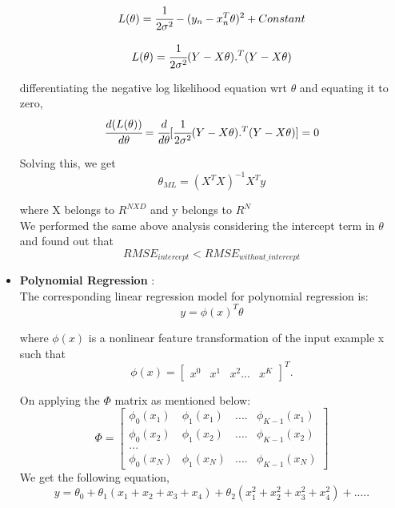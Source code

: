 \documentclass{article}
\begin{document}
\begin{itemize}
     \begin{equation*}
    L(\theta) = \cfrac{1}{2\sigma^2} - (y_n-x_n^T\theta)^2  + Constant
    \end{equation*}
    
     \begin{equation*}
    L(\theta) = \cfrac{1}{2\sigma^2}(Y - X\theta).^T (Y - X\theta) 
    \end{equation*}
    
    differentiating the negative log likelihood equation wrt $\theta$ and equating it to zero, \\
    \begin{equation*}
    \cfrac{d(L(\theta))}{d\theta} = \cfrac{d}{d\theta}
     [\cfrac{1}{2\sigma^2}(Y - X\theta).^T (Y - X\theta)] = 0 
    \end{equation*}
    
    Solving this, we get 
    \begin{equation*}
    \theta_{ML} = (X^{T}X)^{-1}X^{T}y
    \end{equation*}
    
    where X belongs to $R^{NXD}$ and y belongs to $R^{N}$ \\ 
    
    We performed the same above analysis considering the intercept term in $\theta$ and found out that 
    \begin{equation*}
    RMSE_{intercept} < RMSE_{without\_intercept}
    \end{equation*}
    
\item \textbf{Polynomial Regression} : \\
    The corresponding linear regression model for polynomial regression is: 
    \begin{equation*}
    y = \phi(x)^{T} \theta
    \end{equation*} 
    
    where $\phi(x)$ is a nonlinear feature transformation of the input example x such that 
    \begin{equation*}
     \phi(x) = \begin{bmatrix} x^{0} & x^{1} & x^{2} ... & x^{K} \end{bmatrix}^{T}. 
     \end{equation*} 
     
     On applying the $\Phi$ matrix as mentioned below: 
     \begin{equation*}
    \Phi = \begin{bmatrix} \phi_{0}(x_1) & \phi_{1}(x_1) & .... & \phi_{K-1}(x_1) \\ \phi_{0}(x_2) & \phi_{1}(x_2) & .... & \phi_{K-1}(x_2) \\ ... \\ \phi_{0}(x_N) & \phi_{1}(x_N) & .... & \phi_{K-1}(x_N)  \end{bmatrix}   
     \end{equation*} 
    We get the following equation,
   \begin{equation*}
    y = \theta_{0} + \theta_{1}(x_{1} + x_{2} + x_{3} + x_{4}) + \theta_{2}(x_{1}^{2} + x_{2}^{2} + x_{3}^{2} + x_{4}^{2}) + ..... 
    \end{equation*}
    

\end{itemize}
\end{document}
